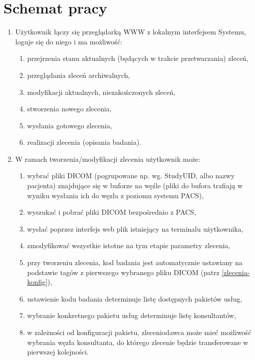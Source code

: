 \documentclass[a4paper]{report}
\begin{document}
\section{Schemat pracy}
\begin{enumerate}
\item Użytkownik łączy się przeglądarką WWW z lokalnym interfejsem Systemu, loguje się do niego i ma możliwość:
        \begin{enumerate}
        \item przejrzenia stanu aktualnych (będących w trakcie przetwarzania) zleceń,
        \item przeglądania zleceń archiwalnych,
        \item modyfikacji aktualnych, niezakończonych zleceń,
        \item stworzenia nowego zlecenia,
        \item wysłania gotowego zlecenia,
        \item realizacji zlecenia (opisania badania).
        \end{enumerate}
\item W ramach tworzenia/modyfikacji zlecenia użytkownik może:
        \begin{enumerate}
        \item wybrać pliki DICOM (pogrupowane np. wg. StudyUID, albo nazwy pacjenta) znajdujące się w buforze na węźle (pliki do bufora trafiają w wyniku wysłania ich do węzła z poziomu systemu PACS),
        \item wyszukać i pobrać pliki DICOM bezpośrednio z PACS,
        \item wysłać poprzez interfejs web plik istniejący na terminalu użytkownika,
        \item zmodyfikować wszystkie istotne na tym etapie parametry zlecenia,
        \item przy tworzeniu zlecenia, kod badania jest automatycznie ustawiany na podstawie tagów z pierwszego wybranego pliku DICOM (patrz \ref{zlecenia-konfig}),
        \item ustawienie kodu badania determinuje listę dostępnych pakietów usług,
        \item wybranie konkretnego pakietu usług determinuje listę konsultantów,
        \item w zależności od konfiguracji pakietu, zleceniodawca może mieć możliwość wybrania węzła konsultanta, do którego zlecenie będzie transferowane w pierwszej kolejności.
        \end{enumerate}
\end{enumerate}
\end{document}
